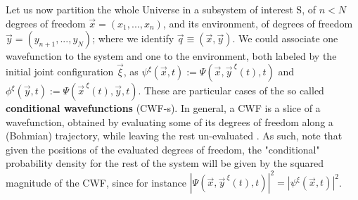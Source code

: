 \documentclass[11pt, a4paper]{article} %
\begin{document}
Let us now partition the whole Universe in a subsystem of interest S, of $n<N$ degrees of freedom $\vec{x}=(x_1,...,x_n)$, and its environment, of degrees of freedom $\vec{y}=(y_{n+1},...,y_N)$; where we identify $\vec{q}\equiv (\vec{x},\vec{y})$. We could associate one wavefunction to the system and one to the environment, both labeled by the initial joint configuration $\vec{\xi}$, as $\psi^\xi(\vec{x},t):=\Psi(\vec{x},\vec{y}^{\:\xi}(t),t)$ and $\phi^\xi(\vec{y},t):=\Psi(\vec{x}^{\:\xi}(t),\vec{y},t)$. These are particular cases of the so called {\bf conditional wavefunctions} (CWF-s). In general, a CWF is a slice of a wavefunction, obtained by evaluating some of its degrees of freedom along a (Bohmian) trajectory, while leaving the rest un-evaluated \cite{Absolute, JordiXavier}. As such, note that given the positions of the evaluated degrees of freedom, the "conditional" probability density for the rest of the system will be given by the squared magnitude of the CWF, since for instance $|\Psi(\vec{x},\vec{y}^{\:\xi}(t), t)|^2=|\psi^\xi(\vec{x},t)|^2$.
\end{document}
